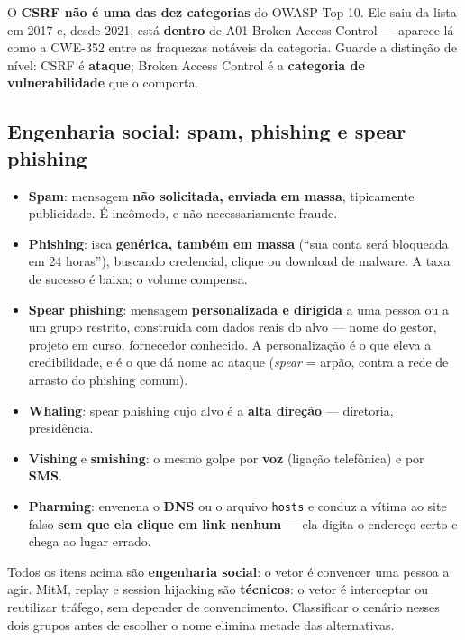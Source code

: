 \begin{cuidado}
O \textbf{CSRF não é uma das dez categorias} do OWASP Top 10. Ele saiu da
lista em 2017 e, desde 2021, está \textbf{dentro} de A01 Broken Access
Control --- aparece lá como a CWE-352 entre as fraquezas notáveis da
categoria. Guarde a distinção de nível: CSRF é \textbf{ataque}; Broken
Access Control é a \textbf{categoria de vulnerabilidade} que o comporta.
\end{cuidado}

\subsection{Engenharia social: spam, phishing e spear phishing}

\begin{conceito}
\begin{itemize}
\item \textbf{Spam}: mensagem \textbf{não solicitada, enviada em massa},
tipicamente publicidade. É incômodo, e não necessariamente fraude.
\item \textbf{Phishing}: isca \textbf{genérica, também em massa} (“sua
conta será bloqueada em 24 horas”), buscando credencial, clique ou
download de malware. A taxa de sucesso é baixa; o volume compensa.
\item \textbf{Spear phishing}: mensagem \textbf{personalizada e dirigida} a
uma pessoa ou a um grupo restrito, construída com dados reais do alvo ---
nome do gestor, projeto em curso, fornecedor conhecido. A personalização é
o que eleva a credibilidade, e é o que dá nome ao ataque
(\textit{spear} = arpão, contra a rede de arrasto do phishing comum).
\item \textbf{Whaling}: spear phishing cujo alvo é a \textbf{alta direção}
--- diretoria, presidência.
\item \textbf{Vishing} e \textbf{smishing}: o mesmo golpe por \textbf{voz}
(ligação telefônica) e por \textbf{SMS}.
\item \textbf{Pharming}: envenena o \textbf{DNS} ou o arquivo
\texttt{hosts} e conduz a vítima ao site falso \textbf{sem que ela clique
em link nenhum} --- ela digita o endereço certo e chega ao lugar errado.
\end{itemize}
\end{conceito}

\begin{regrapratica}
Todos os itens acima são \textbf{engenharia social}: o vetor é convencer
uma pessoa a agir. MitM, replay e session hijacking são \textbf{técnicos}:
o vetor é interceptar ou reutilizar tráfego, sem depender de convencimento.
Classificar o cenário nesses dois grupos antes de escolher o nome elimina
metade das alternativas.
\end{regrapratica}

